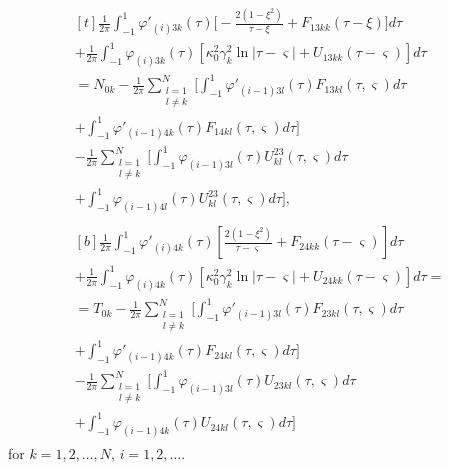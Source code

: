 \begin{equation} \label{PopovEq994019} 
	\begin{aligned}
		\begin{multlined}[t]
			\frac{1}{2\pi} \int_{-1}^{1}\varphi'_{(i)3k}(\tau ) \Bigg[-\frac{2\left(1-\xi ^{2} \right)}{\tau -\xi} +F_{13kk} (\tau -\xi )\Bigg]d\tau 
			\\
			+\frac{1}{2\pi } \int_{-1}^{1}\varphi_{(i)3k} (\tau ) \left[\kappa _{0}^{2} \gamma _{k}^{2} \ln |\tau -\varsigma |+U_{13kk} \left(\tau -\varsigma \right)\right]d\tau 
			\\
			=N_{0k} -\frac{1}{2\pi }\sum _{\substack{l=1 \\ l\ne k}}^{N}\Bigg[ \int _{-1}^{1}\varphi '_{(i-1)3l} (\tau )F_{13kl} (\tau ,\varsigma )d\tau 
			\\
			+ \int _{-1}^{1}\varphi '_{(i-1)4k} (\tau )F_{14kl} (\tau ,\varsigma ) d\tau  \Bigg] 
			\\
			-\frac{1}{2\pi }\sum _{\substack{l=1 \\ l\ne k}}^{N}\Bigg[ \int _{-1}^{1}\varphi_{(i-1)3l} (\tau )U_{kl}^{23} (\tau ,\varsigma )d\tau 
			\\
			+ \int _{-1}^{1}\varphi _{(i-1)4l} (\tau )U_{kl}^{23} (\tau ,\varsigma ) d\tau  \Bigg],  
		\end{multlined}
		\\
		\begin{multlined}[b]
			\frac{1}{2\pi } \int _{-1}^{1}\varphi '_{(i)4k} (\tau ) \left[\frac{2\left(1-\xi ^{2} \right)}{\tau -\varsigma } +F_{24kk} \left(\tau -\varsigma \right)\right]d\tau 
			\\
			+\frac{1}{2\pi } \int _{-1}^{1}\varphi _{(i)4k} (\tau ) \left[\kappa _{0}^{2} \gamma _{k}^{2} \ln \left|\tau -\varsigma \right|+U_{24kk} \left(\tau -\varsigma \right)\right]d\tau =
			\\
			=T_{0k} -\frac{1}{2\pi }\sum_{\substack{l=1 \\ l\ne k}}^{N}\Bigg[ \int _{-1}^{1}\varphi '_{(i-1)3l} (\tau )F_{23kl} (\tau ,\varsigma )d\tau 
			\\
			+\int _{-1}^{1}\varphi '_{(i-1)4k} (\tau )F_{24kl} (\tau ,\varsigma ) d\tau  \Bigg] 
			\\
			-\frac{1}{2\pi }\sum_{\substack{l=1 \\ l\ne k}}^{N}\Bigg[ \int _{-1}^{1}\varphi _{(i-1)3l} (\tau )U_{23kl} (\tau ,\varsigma )d\tau 
			\\
			+\int _{-1}^{1}\varphi _{(i-1)4k} (\tau )U_{24kl} (\tau ,\varsigma ) d\tau  \Bigg]
		\end{multlined}
	\end{aligned}
\end{equation} 
for \( k = 1, 2, \dots, N \), \( i = 1, 2, \dots \).


